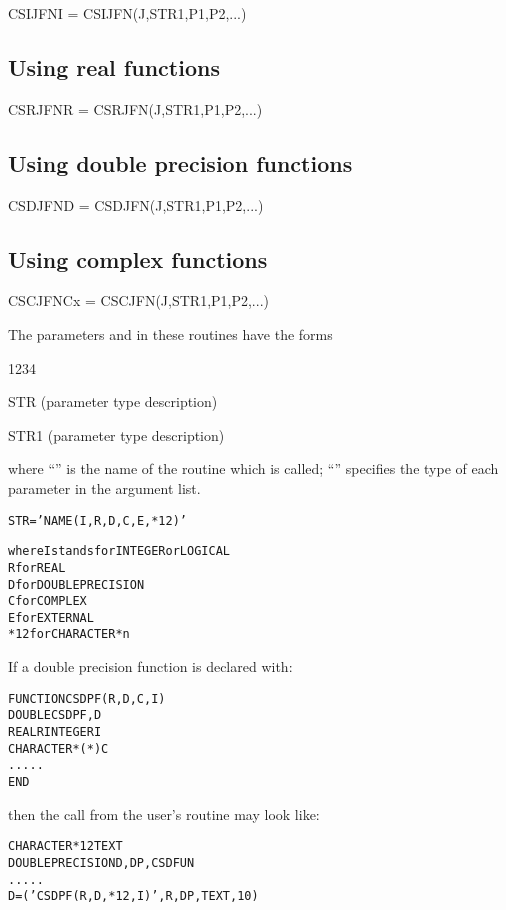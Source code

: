 %
        {CSIJFN}{I = CSIJFN(J,STR1,P1,P2,...)}

\subsection*{Using real \COMIS{} functions}
 
%
        {CSRJFN}{R = CSRJFN(J,STR1,P1,P2,...)}

\subsection*{Using double precision \COMIS{} functions}
%
        {CSDJFN}{D = CSDJFN(J,STR1,P1,P2,...)}

\subsection*{Using complex \COMIS{} functions}

%
        {CSCJFN}{Cx = CSCJFN(J,STR1,P1,P2,...)}
 
The parameters  and  
in these routines have the forms

\begin{DLtt}{1234}
\item[STR]    (parameter type description)
\item[STR1]  (parameter type description)
\end{DLtt}
 
where ``'' is the name of the \COMIS{} routine 
which is called;
``'' specifies the type of each
parameter in the argument list.
 
\Examples
\begin{alltt}
 STR = 'NAME(I,R,D,C,E,*12)'

 where  I  stands for INTEGER or LOGICAL
        R         for REAL
        D         for DOUBLE PRECISION
        C         for COMPLEX
        E         for EXTERNAL
        *12       for CHARACTER *n
\end{alltt}
 
If a double precision \COMIS{} function is declared with:
\begin{alltt}
      FUNCTION CSDPF(R,D,C,I)
      DOUBLE CSDPF,D
      REAL R  INTEGER I
      CHARACTER *(*)C
      .....
      END
\end{alltt}
then the call from the user's routine may look like:
\begin{alltt}
      CHARACTER *12 TEXT
      DOUBLE PRECISION D,DP,CSDFUN
      .....
      D = ('CSDPF(R,D,*12,I)', R, DP,TEXT,10)
\end{alltt}

